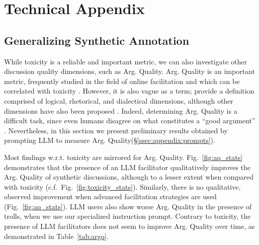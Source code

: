 %
\section{Technical Appendix}

\subsection{Generalizing Synthetic Annotation}

While toxicity is a reliable and important metric, we can also investigate other discussion quality dimensions, such as Arg. Quality. Arg. Quality is an important metric, frequently studied in the field of online facilitation \cite{argyle2023, schroeder-etal-2024-fora, falk-etal-2024-moderation, falk-etal-2021-predicting} and which can be correlated with toxicity \cite{chang-danescu-niculescu-mizil-2019-trouble}. However, it is also vague as a term; \citet{wachsmuth-etal-2017-computational} provide a definition comprised of logical, rhetorical, and dialectical dimensions, although other dimensions have also been proposed \cite{habernal-gurevych-2016-argument, persing-ng-2015-modeling}. Indeed, determining Arg. Quality is a difficult task, since even humans disagree on what constitutes a ``good argument” \cite{wachsmuth-etal-2017-computational, argyle2023}. Nevertheless, in this section we present preliminary results obtained by prompting LLM to measure Arg. Quality(\S\ref{ssec:appendix:prompts}). 

Most findings w.r.t. toxicity are mirrored for Arg. Quality. Fig.~\ref{fig:aq_stats} demonstrates that the presence of an LLM facilitator qualitatively improves the Arg. Quality of synthetic discussions, although to a lesser extent when compared with toxicity (c.f.\  Fig.~\ref{fig:toxicity_stats}). Similarly, there is no qualitative, observed improvement when advanced facilitation strategies are used (Fig.~\ref{fig:aq_stats}). LLM users also show worse Arg. Quality in the presence of trolls, when we use our specialized instruction prompt. Contrary to toxicity, the presence of LLM facilitators does not seem to improve Arg. Quality over time, as demonstrated in Table~\ref{tab:argq}.

